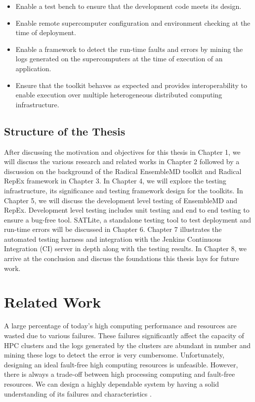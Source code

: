 \documentclass[10pt]{ruthesis}
\begin{document}
\begin{itemize}
    \item Enable a test bench to ensure that the development code meets its design.
	\item Enable remote supercomputer configuration and environment checking at the time of deployment.
	\item Enable a framework to detect the run-time faults and errors by mining the logs generated on the supercomputers at the time of execution of an application.
	\item Ensure that the toolkit behaves as expected and provides interoperability to enable execution over multiple heterogeneous distributed computing infrastructure.
\end{itemize}
   
\section{Structure of the Thesis}
After discussing the motivation and objectives for this thesis in Chapter 1, we will discuss the various research and related works in Chapter 2 followed by a discussion on the background of the Radical EnsembleMD toolkit and Radical RepEx framework in Chapter 3. In Chapter 4, we will explore the testing infrastructure, its significance and testing framework design for the toolkits. In Chapter 5, we will discuss the development level testing of EnsembleMD and RepEx. Development level testing includes unit testing and end to end testing to ensure a bug-free tool. SATLite, a standalone testing tool to test deployment and run-time errors will be discussed in Chapter 6. Chapter 7 illustrates the automated testing harness and integration with the Jenkins Continuous Integration (CI) server in depth along with the testing results. In Chapter 8, we arrive at the conclusion and discuss the foundations this thesis lays for future work. 

\chapter{Related Work}
A large percentage of today's high computing performance and resources are wasted due to various
failures. These failures significantly affect the capacity of HPC clusters and the logs generated by the clusters are abundant in number and mining these logs to detect the error is very cumbersome.
Unfortunately, designing an ideal fault-free high computing resources is unfeasible. However, there is always a trade-off between high processing computing and fault-free resources. We can design a highly dependable system by having a solid understanding of its failures and characteristics \cite{ref8}. 
\end{document}
